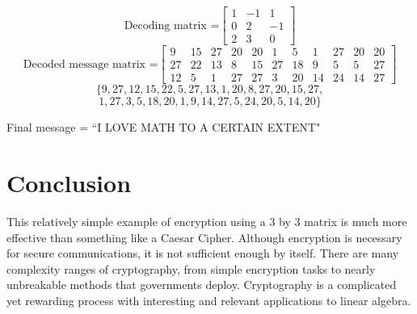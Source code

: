 \documentclass{article}
\begin{document}
$$\text{Decoding matrix =}
\begin{bmatrix}
1 & -1 & 1\\
0 & 2 & -1\\
2 & 3 & 0
\end{bmatrix}
$$
$$\text{Decoded message matrix =}
\begin{bmatrix}
9 & 15 & 27 & 20 & 20 & 1 & 5 & 1 & 27 & 20 & 20 \\
27 & 22 & 13 & 8 & 15 & 27 & 18 & 9 & 5 & 5 & 27\\
12 & 5 & 1 & 27 & 27 & 3 & 20 & 14 & 24 & 14 & 27
\end{bmatrix}
$$
$$
\{9, 27, 12, 15, 22, 5, 27, 13, 1, 20, 8, 27, 20, 15, 27,
$$
$$1, 27, 3, 5, 18, 20, 1, 9, 14, 27, 5, 24, 20, 5, 14, 20\}
$$
\begin{center}
Final message = ``I LOVE MATH TO A CERTAIN EXTENT"
\end{center}

\section{Conclusion}
This relatively simple example of encryption using a 3 by 3 matrix is much more effective than something like a Caesar Cipher. Although encryption is necessary for secure communications, it is not sufficient enough by itself. There are many complexity ranges of cryptography, from simple encryption tasks to nearly unbreakable methods that governments deploy. Cryptography is a complicated yet rewarding process with interesting and relevant applications to linear algebra. \\

\newpage


\end{document}
